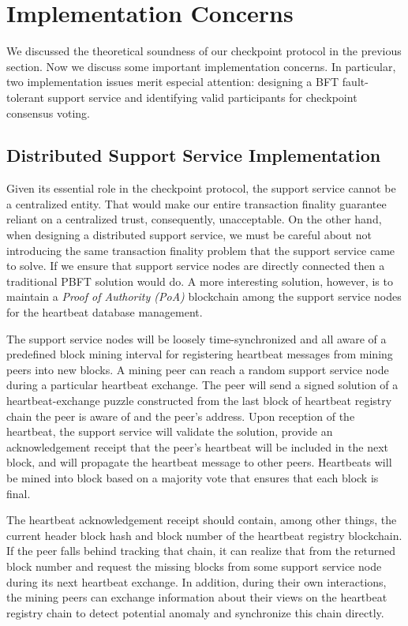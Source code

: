 
\section{Implementation Concerns}
\label{s-implementation}
We discussed the theoretical soundness of our checkpoint protocol in the previous section. Now we discuss some important implementation concerns. In particular, two implementation issues merit especial attention: designing a BFT fault-tolerant support service and identifying valid participants for checkpoint consensus voting.       

\subsection{Distributed Support Service Implementation}
Given its essential role in the checkpoint protocol, the support service cannot be a centralized entity. That would make our entire transaction finality guarantee reliant on a centralized trust, consequently, unacceptable. On the other hand, when designing a distributed support service, we must be careful about not introducing the same transaction finality problem that the support service came to solve. If we ensure that support service nodes are directly connected then a traditional PBFT \cite{Castro:1999:PBF:296806.296824} solution would do. A more interesting solution, however, is to maintain a \textit{Proof of Authority (PoA)} blockchain among the support service nodes for the heartbeat database management.           

The support service nodes will be loosely time-synchronized and all aware of a predefined block mining interval for registering heartbeat messages from mining peers into new blocks. A mining peer can reach a random support service node during a particular heartbeat exchange. The peer will send a signed solution of a heartbeat-exchange puzzle constructed from the last block of heartbeat registry chain the peer is aware of and the peer's address. Upon reception of the heartbeat, the support service will validate the solution, provide an acknowledgement receipt that the peer's heartbeat will be included in the next block, and will propagate the heartbeat message to other peers. Heartbeats will be mined into block based on a majority vote that ensures that each block is final. 

The heartbeat acknowledgement receipt should contain, among other things, the current header block hash and block number of the heartbeat registry blockchain. If the peer falls behind tracking that chain, it can realize that from the returned block number and request the missing blocks from some support service node during its next heartbeat exchange. In addition, during their own interactions, the mining peers can exchange information about their views on the heartbeat registry chain to detect potential anomaly and synchronize this chain directly.

